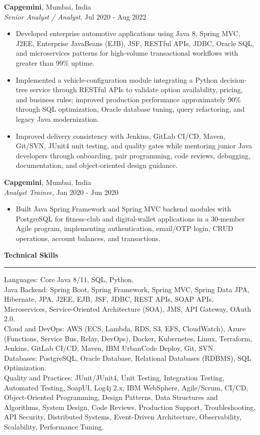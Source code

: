 \documentclass[10pt,letterpaper]{article}
\newcommand{\ressection}[1]{%
  \vspace{4pt}\par\textbf{#1}\par\vspace{1.5pt}\hrule\vspace{2.5pt}
}
\begin{document}
\textbf{Capgemini}, Mumbai, India\\
\textit{Senior Analyst / Analyst}, Jul 2020 - Aug 2022
\begin{itemize}
  \item Developed enterprise automotive applications using Java 8, Spring MVC, J2EE, Enterprise JavaBeans (EJB), JSF, RESTful APIs, JDBC, Oracle SQL, and microservices patterns for high-volume transactional workflows with greater than 99\% uptime.
  \item Implemented a vehicle-configuration module integrating a Python decision-tree service through RESTful APIs to validate option availability, pricing, and business rules; improved production performance approximately 90\% through SQL optimization, Oracle database tuning, query refactoring, and legacy Java modernization.
  \item Improved delivery consistency with Jenkins, GitLab CI/CD, Maven, Git/SVN, JUnit4 unit testing, and quality gates while mentoring junior Java developers through onboarding, pair programming, code reviews, debugging, documentation, and object-oriented design guidance.
\end{itemize}

\textbf{Capgemini}, Mumbai, India\\
\textit{Analyst Trainee}, Jan 2020 - Jun 2020
\begin{itemize}
  \item Built Java Spring Framework and Spring MVC backend modules with PostgreSQL for fitness-club and digital-wallet applications in a 30-member Agile program, implementing authentication, email/OTP login, CRUD operations, account balances, and transactions.
\end{itemize}

\ressection{Technical Skills}
Languages: Core Java 8/11, SQL, Python.\\
Java Backend: Spring Boot, Spring Framework, Spring MVC, Spring Data JPA, Hibernate, JPA, J2EE, EJB, JSF, JDBC, REST APIs, SOAP APIs, Microservices, Service-Oriented Architecture (SOA), JMS, API Gateway, OAuth 2.0.\\
Cloud and DevOps: AWS (ECS, Lambda, RDS, S3, EFS, CloudWatch), Azure (Functions, Service Bus, Relay, DevOps), Docker, Kubernetes, Linux, Terraform, Jenkins, GitLab CI/CD, Maven, IBM UrbanCode Deploy, Git, SVN.\\
Databases: PostgreSQL, Oracle Database, Relational Databases (RDBMS), SQL Optimization.\\
Quality and Practices: JUnit/JUnit4, Unit Testing, Integration Testing, Automated Testing, SoapUI, Log4j 2.x, IBM WebSphere, Agile/Scrum, CI/CD, Object-Oriented Programming, Design Patterns, Data Structures and Algorithms, System Design, Code Reviews, Production Support, Troubleshooting, API Security, Distributed Systems, Event-Driven Architecture, Observability, Scalability, Performance Tuning.
\end{document}
